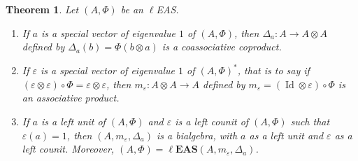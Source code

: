 \documentclass[pdftex]{sigma}
\numberwithin{equation}{section}
\newtheorem{Theorem}{Theorem}[section]
\newcommand{\leas}{\ell\mathbf{EAS}}
\begin{document}
\begin{Theorem}\label{theo5.12}
Let $(A,\Phi)$ be an $\ell$EAS.
\begin{enumerate}\itemsep=0pt
\item[$(1)$] If $a$ is a special vector of eigenvalue $1$ of $(A,\Phi)$, then $\Delta_a\colon A\longrightarrow A\otimes A$ defined by $\Delta_a(b)=\Phi(b\otimes a)$ is a coassociative coproduct.
\item[$(2)$] If $\varepsilon$ is a special vector of eigenvalue $1$ of $(A,\Phi)^*$, that is to say if $(\varepsilon\otimes \varepsilon)\circ \Phi=\varepsilon\otimes \varepsilon$,
 then $m_\varepsilon\colon A\otimes A\longrightarrow A$ defined by $m_\varepsilon=(\operatorname{Id} \otimes \varepsilon)\circ \Phi$ is an associative product.
\item[$(3)$] If $a$ is a left unit of $(A,\Phi)$ and $\varepsilon$ is a left counit of $(A,\Phi)$ such that $\varepsilon(a)=1$, then $(A,m_\varepsilon,\Delta_a)$ is a bialgebra, with $a$ as a left unit and $\varepsilon$ as a left counit.
Moreover, $(A,\Phi)=\leas(A,m_\varepsilon,\Delta_a)$.
\end{enumerate}\end{Theorem}
\end{document}
